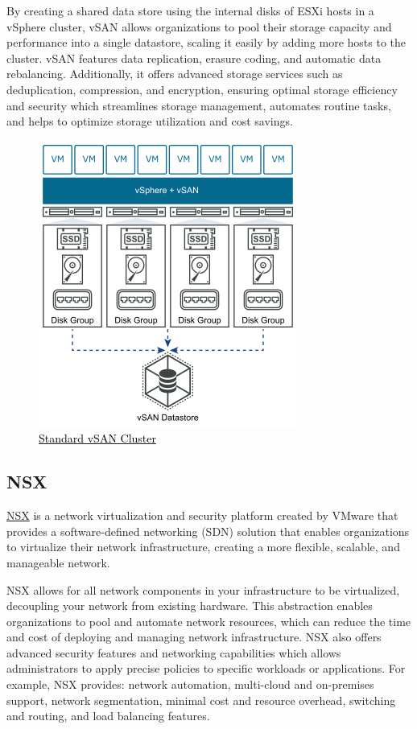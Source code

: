 By creating a shared data store using the internal disks of ESXi hosts in a vSphere cluster, vSAN allows organizations to pool their storage capacity and performance into a single datastore, scaling it easily by adding more hosts to the cluster. vSAN features data replication, erasure coding, and automatic data rebalancing. Additionally, it offers advanced storage services such as deduplication, compression, and encryption, ensuring optimal storage efficiency and security which streamlines storage management, automates routine tasks, and helps to optimize storage utilization and cost savings.

\begin{figure}[H]
    \centering
    \includegraphics[scale = .8]{images/vsan-deployment.png}
    \caption{\href{https://docs.vmware.com/en/VMware-vSphere/7.0/com.vmware.vsphere.vsan-planning.doc/GUID-A80526C8-A941-4F84-9D44-D4B8B3914A95.html}{\textcolor{black}{Standard vSAN Cluster}}}
    \label{vSan}
\end{figure}

\subsection{NSX}
\href{https://docs.vmware.com/en/VMware-NSX/index.html}{NSX} is a network virtualization and security platform created by VMware that provides a software-defined networking (SDN) solution that enables organizations to virtualize their network infrastructure, creating a more flexible, scalable, and manageable network.

NSX allows for all network components in your infrastructure to be virtualized, decoupling your network from existing hardware. This abstraction enables organizations to pool and automate network resources, which can reduce the time and cost of deploying and managing network infrastructure. NSX also offers advanced security features and networking capabilities which allows administrators to apply precise policies to specific workloads or applications. For example, NSX provides: network automation, multi-cloud and on-premises support, network segmentation, minimal cost and resource overhead, switching and routing, and load balancing features. 

